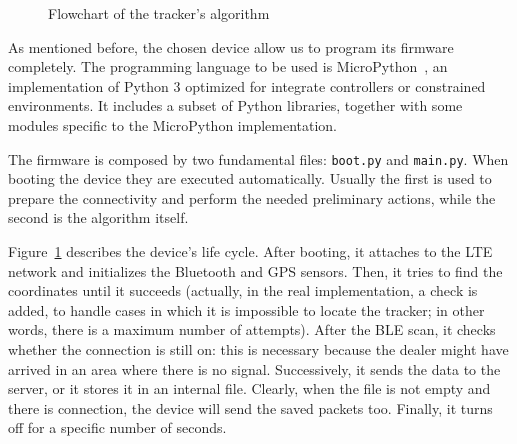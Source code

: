 \begin{figure}[htb]
\caption{Flowchart of the tracker's algorithm}
\label{flowchart}
\end{figure}

As mentioned before, the chosen device allow us to program its firmware completely. The programming language to be used is MicroPython~\cite{micropy}, an implementation of Python 3 optimized for integrate controllers or constrained environments. It includes a subset of Python libraries, together with some modules specific to the MicroPython implementation.

The firmware is composed by two fundamental files: \texttt{boot.py} and \texttt{main.py}. When booting the device they are executed automatically. Usually the first is used to prepare the connectivity and perform the needed preliminary actions, while the second is the algorithm itself.

Figure~\ref{flowchart} describes the device's life cycle. After booting, it attaches to the LTE network and initializes the Bluetooth and GPS sensors. Then, it tries to find the coordinates until it succeeds (actually, in the real implementation, a check is added, to handle cases in which it is impossible to locate the tracker; in other words, there is a maximum number of attempts). After the BLE scan, it checks whether the connection is still on: this is necessary because the dealer might have arrived in an area where there is no signal. Successively, it sends the data to the server, or it stores it in an internal file. Clearly, when the file is not empty and there is connection, the device will send the saved packets too. Finally, it turns off for a specific number of seconds.

